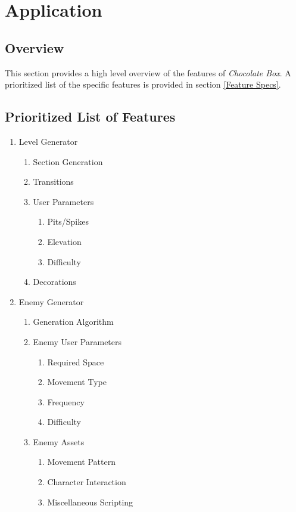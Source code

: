 \documentclass[pdftex,12pt,letter]{article}
\begin{document}
\section{Application}
\subsection{Overview}
This section provides a high level overview of the features of \textit{Chocolate Box}. A prioritized list of the specific features is provided in section \ref{Feature Specs}.

\subsection{Prioritized List of Features}
\begin{enumerate}
\item Level Generator
\begin{enumerate}
\item Section Generation
\item Transitions
\item User Parameters
\begin{enumerate}
\item Pits/Spikes
\item Elevation
\item Difficulty
\end{enumerate}
\item Decorations
\end{enumerate}

\item Enemy Generator
\begin{enumerate}
\item Generation Algorithm
\item Enemy User Parameters
\begin{enumerate}
\item Required Space
\item Movement Type
\item Frequency
\item Difficulty
\end{enumerate}
\item Enemy Assets
\begin{enumerate}
\item Movement Pattern
\item Character Interaction
\item Miscellaneous Scripting
\end{enumerate}
\end{enumerate}


\end{enumerate}
\end{document}
